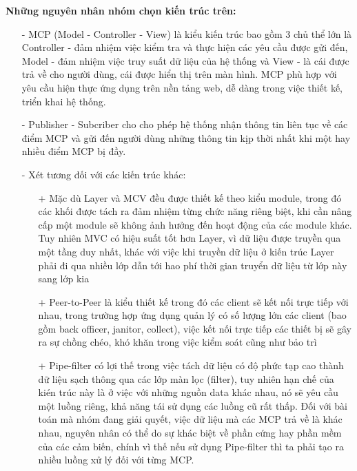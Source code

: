 	\quad \textbf{Những nguyên nhân nhóm chọn kiến trúc trên:}
	\begin{enumerate}
		\item[-] MCP (Model - Controller - View) là kiểu kiến trúc bao gồm 3 chủ thể lớn là Controller - đảm nhiệm việc kiểm tra và thực hiện các yêu cầu được gửi đến, Model - đảm nhiệm việc truy suất dữ liệu của hệ thống và View - là cái được trả về cho người dùng, cái được hiển thị trên màn hình. MCP phù hợp với yêu cầu hiện thực ứng dụng trên nền tảng web, dễ dàng trong việc thiết kế, triển khai hệ thống.
		\item[-] Publisher - Subcriber cho cho phép hệ thống nhận thông tin liên tục về các điểm MCP và gửi đến người dùng những thông tin kịp thời nhất khi một hay nhiều điểm MCP bị đầy.
		\item[-] Xét tương đối với các kiến trúc khác:
		\begin{enumerate}
			\item[+] Mặc dù Layer và MCV đều được thiết kế theo kiểu module, trong đó các khối được tách ra đảm nhiệm từng chức năng riêng biệt, khi cần nâng cấp một module sẽ không ảnh hưởng đến hoạt động của các module khác. Tuy nhiên MVC có hiệu suất tốt hơn Layer, vì dữ liệu được truyền qua một tầng duy nhất, khác với việc khi truyền dữ liệu ở kiến trúc Layer phải đi qua nhiều lớp dẫn tới hao phí thời gian truyển dữ liệu từ lớp này sang lớp kia
			\item[+] Peer-to-Peer là kiểu thiết kế trong đó các client sẽ kết nối trực tiếp với nhau, trong trường hợp ứng dụng quản lý có số lượng lớn các client (bao gồm back officer, janitor, collect), việc kết nối trực tiếp các thiết bị sẽ gây ra sự chồng chéo, khó khăn trong việc kiểm soát cũng như bảo trì
			\item[+] Pipe-filter có lợi thế trong	 việc tách dữ liệu có độ phức tạp cao thành dữ liệu sạch thông qua các lớp màn lọc (filter), tuy nhiên hạn chế của kién trúc này là ở việc với những nguồn data khác nhau, nó sẽ yêu cầu một luồng riêng, khả năng tái sử dụng các luồng cũ rất thấp. Đối với bài toán mà nhóm đang giải quyết, việc dữ liệu mà các MCP trả về là khác nhau, nguyên nhân có thể do sự khác biệt về phần cứng hay phần mềm của các cảm biến, chính vì thế nếu sử dụng Pipe-filter thì ta phải tạo ra nhiều luồng xử lý đối với từng MCP.
		\end{enumerate}
	\end{enumerate}
  
